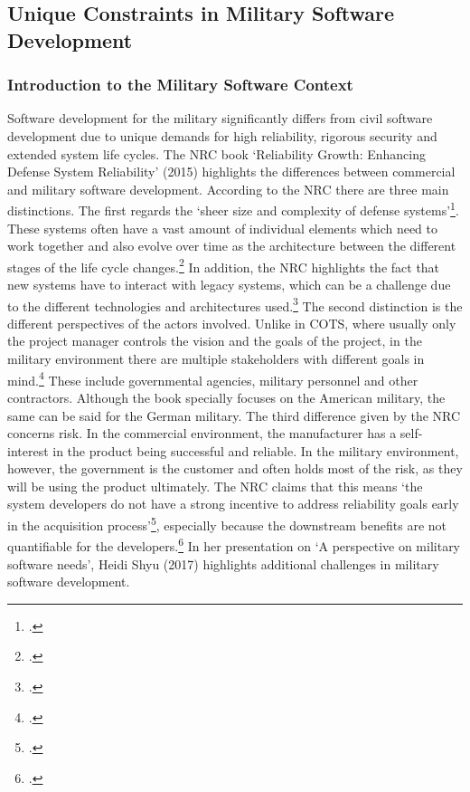 \subsection{Unique Constraints in Military Software Development}
\subsubsection{Introduction to the Military Software Context}
Software development for the military significantly differs from civil software development due to unique demands for high reliability, rigorous security and extended system life cycles.
The \ac{NRC} book `Reliability Growth: Enhancing Defense System Reliability' (2015) highlights the differences between commercial and military software development.
According to the NRC there are three main distinctions. The first regards the `sheer size and complexity of defense systems'\footcite[31]{nrc2015defense}.
These systems often have a vast amount of individual elements which need to work together and also evolve over time as the architecture  between the different stages of 
the life cycle changes.\footcite[32]{nrc2015defense} In addition, the \ac{NRC} highlights the fact that new systems have to interact with legacy systems, which can be a challenge
due to the different technologies and architectures used.\footcite[32]{nrc2015defense}
The second distinction is the different perspectives of the actors involved. Unlike in \ac{COTS}, where usually only the project manager 
controls the vision and the goals of the project, in the military environment there are multiple stakeholders with different goals in mind.\footcite[32]{nrc2015defense}
These include governmental agencies, military personnel and other contractors.
Although the book specially focuses on the American military, the same can be said for the German military.
The third difference given by the NRC concerns risk. In the commercial environment, the manufacturer has a self-interest in the product being successful and reliable.
In the military environment, however, the government is the customer and often holds most of the risk, as they will be using the product ultimately.
The NRC claims that this means `the system developers do not have a strong incentive to address reliability goals early in the acquisition process'\footcite[33]{nrc2015defense},
especially because the downstream benefits are not quantifiable for the developers.\footcite[33]{nrc2015defense}
In her presentation on `A perspective on military software needs', Heidi Shyu (2017) highlights additional challenges in military software development.
